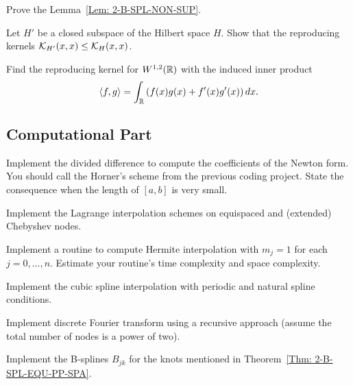 \begin{problem}
\label{Prb: 2-B-SPL-NON-SUP}
    Prove the Lemma~\ref{Lem: 2-B-SPL-NON-SUP}.
\end{problem}
\begin{problem}
\label{Exer:2-Rep-Ker-Ine}
    Let $H'$ be a closed subspace of the Hilbert space $H$. Show that the reproducing kernels $\mathcal K_{H'}(x, x) \le \mathcal K_{H}(x, x)$. 
\end{problem}
\begin{problem}
    Find the reproducing kernel for $W^{1,2}(\mathbb R)$ with the induced inner product
    \begin{equation*}
        \langle {f, g} \rangle = \int_{\mathbb R} \left( f(x) {g(x)} + f'(x) {g'(x)} \right) dx. 
    \end{equation*}
\end{problem}
\subsection{Computational Part}
\begin{problem}
    Implement the divided difference to compute the coefficients of the Newton form. You should call the Horner's scheme from the previous coding project. State the consequence when the length of $[a, b]$ is very small. 
\end{problem}
\begin{problem}
    Implement the Lagrange interpolation schemes on equispaced and (extended) Chebyshev nodes.
\end{problem}
\begin{problem}
    Implement a routine to compute Hermite interpolation with $m_j = 1$ for each $j = 0, \dots, n$. Estimate your routine's time complexity and space complexity. 
\end{problem}
\begin{problem}
    Implement the cubic spline interpolation with periodic and natural spline conditions. 
\end{problem}

\begin{problem}
     Implement discrete Fourier transform using a recursive approach (assume the total number of nodes is a power of two).
\end{problem}

\begin{problem}
    Implement the B-splines $B_{jk}$ for the knots mentioned in Theorem~\ref{Thm: 2-B-SPL-EQU-PP-SPA}.
\end{problem}

% 
\nocite{jackson1912approximation, jackson1913accuracy, erdHos1964problems,erdos1958problems,de1978practical,prenter2008splines,trefethen1991two}


